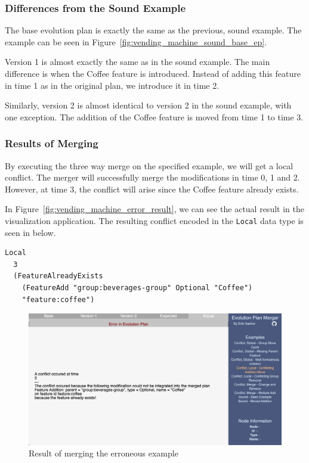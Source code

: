 \documentclass[a4paper,english]{ifimaster}
\begin{document}
\subsubsection{Differences from the Sound Example}%

The base evolution plan is exactly the same as the previous, sound example. The example can be seen in Figure~\vref{fig:vending_machine_sound_base_ep}.

Version 1 is almost exactly the same as in the sound example. The main difference is when the Coffee feature is introduced. Instead of adding this feature in time 1 as in the original plan, we introduce it in time 2.

Similarly, version 2 is almost identical to version 2 in the sound example, with one exception. The addition of the Coffee feature is moved from time 1 to time 3.

\subsubsection{Results of Merging}%
\label{ssub:results_of_merging}

By executing the three way merge on the specified example, we will get a local conflict. The merger will successfully merge the modifications in time 0, 1 and 2. However, at time 3, the conflict will arise since the Coffee feature already exists.

In Figure~\vref{fig:vending_machine_error_result}, we can see the actual result in the visualization application. The resulting conflict encoded in the \texttt{Local} data type is seen in below.

\begin{verbatim}
Local 
  3 
  (FeatureAlreadyExists
    (FeatureAdd "group:beverages-group" Optional "Coffee")
    "feature:coffee")
\end{verbatim}

\begin{figure}[htpb]
  \centering
  \includegraphics[width=\linewidth]{vending_machine/error_result.png}
  \caption{Result of merging the erroneous example}%
  \label{fig:vending_machine_error_result}
\end{figure}
\end{document}
